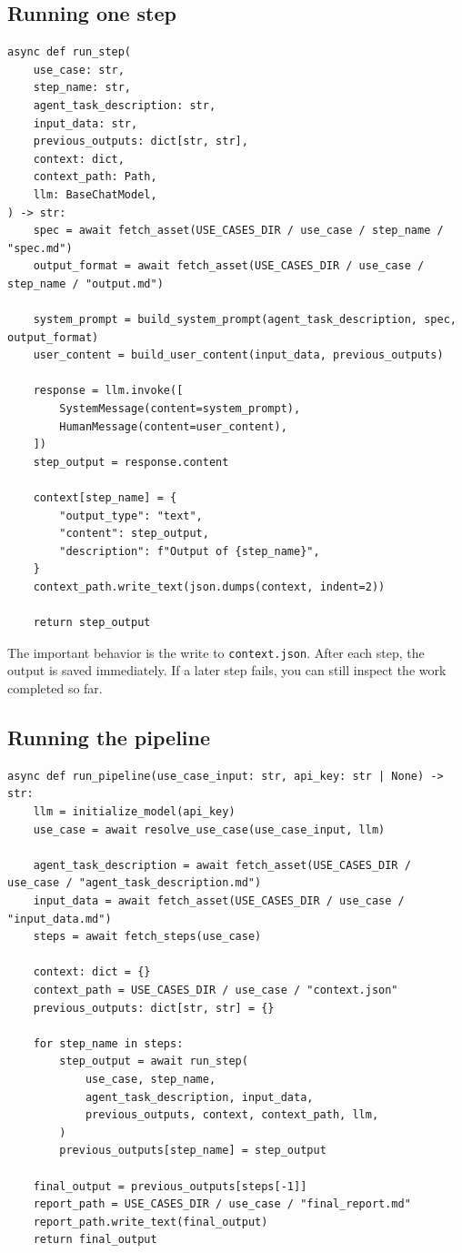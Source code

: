 \documentclass[12pt, a4paper]{article}
\begin{document}
\subsection{Running one step}

\begin{lstlisting}[style=pythonstyle]
async def run_step(
    use_case: str,
    step_name: str,
    agent_task_description: str,
    input_data: str,
    previous_outputs: dict[str, str],
    context: dict,
    context_path: Path,
    llm: BaseChatModel,
) -> str:
    spec = await fetch_asset(USE_CASES_DIR / use_case / step_name / "spec.md")
    output_format = await fetch_asset(USE_CASES_DIR / use_case / step_name / "output.md")

    system_prompt = build_system_prompt(agent_task_description, spec, output_format)
    user_content = build_user_content(input_data, previous_outputs)

    response = llm.invoke([
        SystemMessage(content=system_prompt),
        HumanMessage(content=user_content),
    ])
    step_output = response.content

    context[step_name] = {
        "output_type": "text",
        "content": step_output,
        "description": f"Output of {step_name}",
    }
    context_path.write_text(json.dumps(context, indent=2))

    return step_output
\end{lstlisting}

The important behavior is the write to \texttt{context.json}. After each step, the output is saved immediately. If a later step fails, you can still inspect the work completed so far.

\subsection{Running the pipeline}

\begin{lstlisting}[style=pythonstyle]
async def run_pipeline(use_case_input: str, api_key: str | None) -> str:
    llm = initialize_model(api_key)
    use_case = await resolve_use_case(use_case_input, llm)

    agent_task_description = await fetch_asset(USE_CASES_DIR / use_case / "agent_task_description.md")
    input_data = await fetch_asset(USE_CASES_DIR / use_case / "input_data.md")
    steps = await fetch_steps(use_case)

    context: dict = {}
    context_path = USE_CASES_DIR / use_case / "context.json"
    previous_outputs: dict[str, str] = {}

    for step_name in steps:
        step_output = await run_step(
            use_case, step_name,
            agent_task_description, input_data,
            previous_outputs, context, context_path, llm,
        )
        previous_outputs[step_name] = step_output

    final_output = previous_outputs[steps[-1]]
    report_path = USE_CASES_DIR / use_case / "final_report.md"
    report_path.write_text(final_output)
    return final_output
\end{lstlisting}
\end{document}
